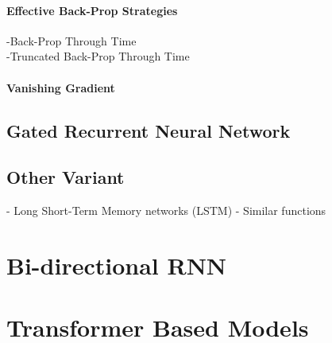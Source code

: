 				\paragraph*{Effective Back-Prop Strategies}

					-Back-Prop Through Time\\
					-Truncated Back-Prop Through Time

				\paragraph*{Vanishing Gradient}

		\subsection{Gated Recurrent Neural Network}

		\subsection{Other Variant}

				- Long Short-Term Memory networks (LSTM)
				- Similar functions
	\section{Bi-directional RNN}

	\section{Transformer Based Models}





		
